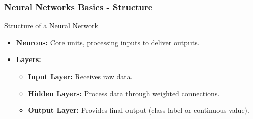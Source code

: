 \documentclass[aspectratio=169]{beamer}
\begin{document}
\begin{frame}[fragile]
    \frametitle{Neural Networks Basics - Structure}
    \begin{block}{Structure of a Neural Network}
        \begin{itemize}
            \item \textbf{Neurons:} Core units, processing inputs to deliver outputs.
            \item \textbf{Layers:}
            \begin{itemize}
                \item \textbf{Input Layer:} Receives raw data.
                \item \textbf{Hidden Layers:} Process data through weighted connections.
                \item \textbf{Output Layer:} Provides final output (class label or continuous value).
            \end{itemize}
        \end{itemize}
    \end{block}
\end{frame}
\end{document}
